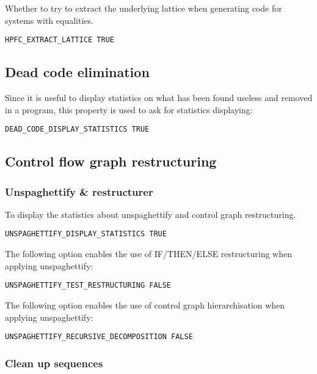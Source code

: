 Whether to try to extract the underlying lattice when generating code for
systems with equalities.

\begin{verbatim}
HPFC_EXTRACT_LATTICE TRUE
\end{verbatim}


\subsection{Dead code elimination}

Since it is useful to display statistics on what has been found
useless and removed in a program, this property is used to ask for
statistics displaying:
\begin{verbatim}
DEAD_CODE_DISPLAY_STATISTICS TRUE
\end{verbatim}



\subsection{Control flow graph restructuring}



\subsubsection{Unspaghettify \& restructurer}


To display the statistics about unspaghettify and control graph
restructuring.
\begin{verbatim}
UNSPAGHETTIFY_DISPLAY_STATISTICS TRUE
\end{verbatim}

The following option enables the use of IF/THEN/ELSE restructuring
when applying unspaghettify:
\begin{verbatim}
UNSPAGHETTIFY_TEST_RESTRUCTURING FALSE
\end{verbatim}

The following option enables the use of control graph hierarchisation
when applying unspaghettify:
\begin{verbatim}
UNSPAGHETTIFY_RECURSIVE_DECOMPOSITION FALSE
\end{verbatim}


\subsubsection{Clean up sequences}


